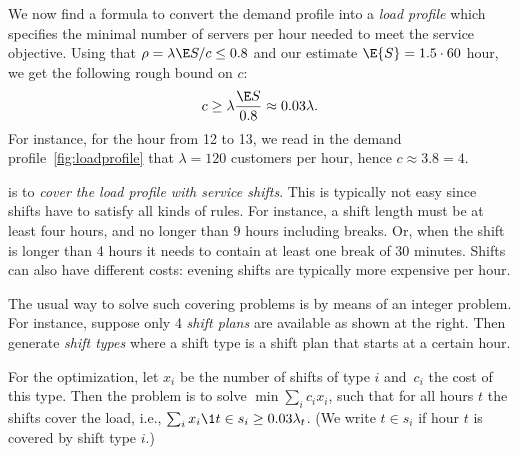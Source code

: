 We now find a formula to convert the demand profile into a \emph{load profile} which specifies the minimal number of servers per hour needed to meet the service objective.
Using that $\rho = \lambda \E S/c \leq 0.8 $ and our estimate $\E{S}=1.5\cdot 60$ hour, we get the following rough bound on $c$:
\begin{equation*}
c \geq \lambda \frac{\E S}{0.8} \approx 0.03 \lambda.
\end{equation*}
For instance, for the hour from 12 to 13, we read in the demand profile~\cref{fig:loadprofile} that $\lambda= 120$ customers per hour, hence $c\approx 3.8 = 4$.

 is to \emph{cover the load profile with service shifts}.
This is typically not easy since shifts have to satisfy all kinds of rules.
For instance, a shift length must be at least four hours, and no longer than 9 hours including breaks.
Or, when the shift is longer than 4 hours it needs to contain at least one break of 30 minutes.
Shifts can also have different costs: evening shifts are typically  more expensive per hour.

The usual way to solve such covering problems is by means of an integer
problem. For instance, suppose only 4 \emph{shift plans} are available as shown at the right.
Then generate \emph{shift types} where a shift type is a shift plan that starts at a certain hour.

For the optimization, let $x_i$ be the number of shifts of type $i$ and~$c_i$ the cost of this type.
Then the problem is to solve $\min \sum_i c_i x_i$,
such that for all hours $t$ the shifts cover the load, i.e., $\sum_i x_i \1{t \in s_i} \geq 0.03 \lambda_t$.
(We write $t\in s_i$ if hour $t$ is covered by shift type $i$.)

